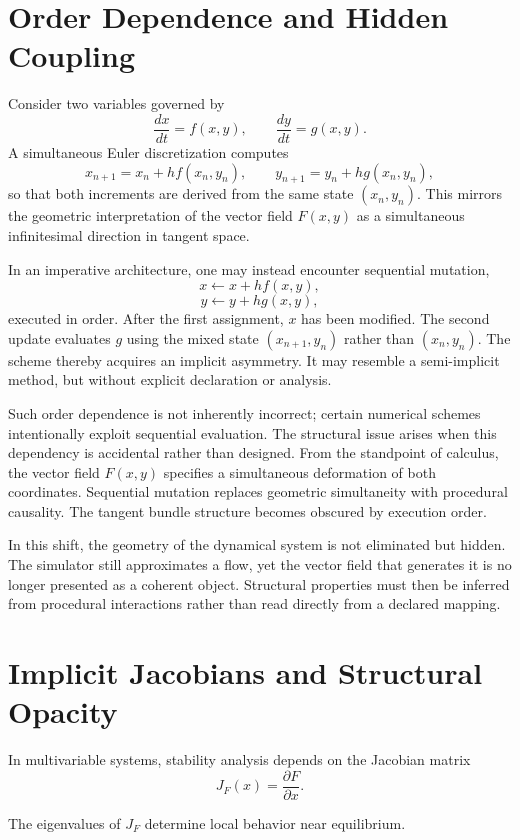 \documentclass[12pt]{book}
\begin{document}
\section{Order Dependence and Hidden Coupling}

Consider two variables governed by
\[
\frac{dx}{dt} = f(x,y), \qquad
\frac{dy}{dt} = g(x,y).
\]
A simultaneous Euler discretization computes
\[
x_{n+1} = x_n + h f(x_n, y_n), \qquad
y_{n+1} = y_n + h g(x_n, y_n),
\]
so that both increments are derived from the same state
$(x_n, y_n)$. This mirrors the geometric interpretation of the vector
field $F(x,y)$ as a simultaneous infinitesimal direction in tangent
space.

In an imperative architecture, one may instead encounter sequential
mutation,
\[
x \leftarrow x + h f(x,y),
\]
\[
y \leftarrow y + h g(x,y),
\]
executed in order. After the first assignment, $x$ has been modified.
The second update evaluates $g$ using the mixed state
$(x_{n+1}, y_n)$ rather than $(x_n, y_n)$. The scheme thereby acquires
an implicit asymmetry. It may resemble a semi-implicit method, but
without explicit declaration or analysis.

Such order dependence is not inherently incorrect; certain numerical
schemes intentionally exploit sequential evaluation. The structural
issue arises when this dependency is accidental rather than designed.
From the standpoint of calculus, the vector field $F(x,y)$ specifies
a simultaneous deformation of both coordinates. Sequential mutation
replaces geometric simultaneity with procedural causality. The tangent
bundle structure becomes obscured by execution order.

In this shift, the geometry of the dynamical system is not eliminated
but hidden. The simulator still approximates a flow, yet the vector
field that generates it is no longer presented as a coherent object.
Structural properties must then be inferred from procedural
interactions rather than read directly from a declared mapping.

\section{Implicit Jacobians and Structural Opacity}

In multivariable systems, stability analysis depends on the Jacobian matrix
\[
J_F(x) = \frac{\partial F}{\partial x}.
\]

The eigenvalues of $J_F$ determine local behavior near equilibrium.
\end{document}
